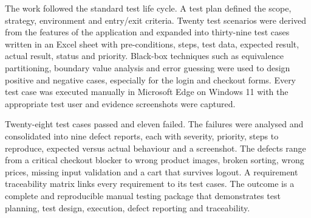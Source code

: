 \documentclass[12pt,a4paper]{article}
\begin{document}
The work followed the standard test life cycle. A test plan defined the scope, strategy, environment and entry/exit criteria. Twenty test scenarios were derived from the features of the application and expanded into thirty-nine test cases written in an Excel sheet with pre-conditions, steps, test data, expected result, actual result, status and priority. Black-box techniques such as equivalence partitioning, boundary value analysis and error guessing were used to design positive and negative cases, especially for the login and checkout forms. Every test case was executed manually in Microsoft Edge on Windows 11 with the appropriate test user and evidence screenshots were captured.

Twenty-eight test cases passed and eleven failed. The failures were analysed and consolidated into nine defect reports, each with severity, priority, steps to reproduce, expected versus actual behaviour and a screenshot. The defects range from a critical checkout blocker to wrong product images, broken sorting, wrong prices, missing input validation and a cart that survives logout. A requirement traceability matrix links every requirement to its test cases. The outcome is a complete and reproducible manual testing package that demonstrates test planning, test design, execution, defect reporting and traceability.
\newpage
\end{document}
